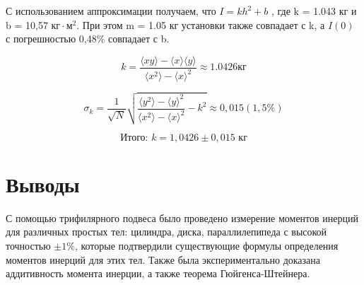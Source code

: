 \documentclass[a4paper]{article}
\begin{document}
С использованием аппроксимации получаем, что $I = k h^2 + b$ , где k = 1.043 кг и b = 10,57 $\text{кг}\cdot\text{м}^2$.
При этом m = 1.05 кг установки также совпадает с k, а $I(0)$ с погрешностью 0,48\% совпадает с b.

\[k=\frac{\langle xy\rangle-\langle x\rangle \langle y\rangle}{\langle x^2\rangle - \langle x\rangle^2}\approx 1.0426 кг\]

\[\sigma_{k} = \frac{1}{\sqrt{N}}\sqrt{\frac{\langle y^2 \rangle - \langle y \rangle ^2}{\langle x^2 \rangle - \langle x \rangle ^2} - k^2} \approx 0,015 (1,5\%)\]

\[\text{Итого: } k = 1,0426 \pm 0,015 \text{ кг}\]

\newpage
    \section{Выводы}

    С помощью трифилярного подвеса было проведено измерение моментов инерций для различных простых тел: цилиндра, диска, параллилепипеда с высокой точностью $\pm 1\%$, которые подтвердили существующие формулы определения моментов инерций для этих тел.
    Также была экспериментально доказана аддитивность момента инерции, а также теорема Гюйгенса-Штейнера.
\end{document}
